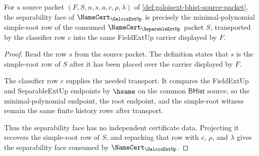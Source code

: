 \begin{theorem}
\label{thm:galoisext-separability-obligation-row}
For a source packet $(F,S,n,s,a,c,\rho,\lambda)$ of
\autoref{def:galoisext-bhist-source-packet}, the separability face of
$\NameCert_{\GaloisExtUp}$ is precisely the minimal-polynomial simple-root row
of the consumed $\NameCert_{\SeparableExtUp}$ packet $S$, transported by the
classifier row $c$ into the same FieldExtUp carrier displayed by $F$.
\end{theorem}
\begin{proof}
Read the row $s$ from the source packet. The definition states that $s$ is the
simple-root row of $S$ after it has been placed over the carrier displayed by
$F$.

The classifier row $c$ supplies the needed transport. It compares the
FieldExtUp and SeparableExtUp endpoints by $\hsame$ on the common
$\mathsf{BHist}$ source, so the minimal-polynomial endpoint, the root endpoint,
and the simple-root witness remain the same finite history rows after
transport.

Thus the separability face has no independent certificate data. Projecting it
recovers the simple-root row of $S$, and repacking that row with $c$, $\rho$,
and $\lambda$ gives the separability face consumed by
$\NameCert_{\GaloisExtUp}$.
\end{proof}

